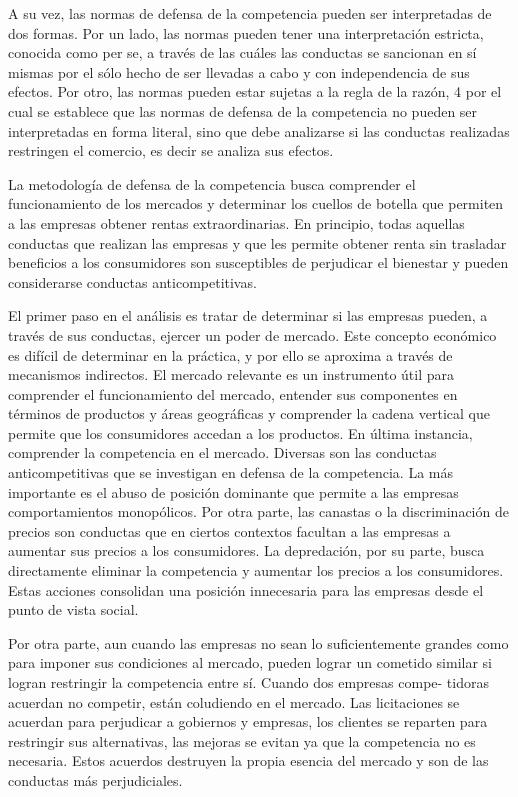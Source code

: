 \documentclass[
  12pt,
  spanish,
]{book}
\begin{document}
A su vez, las normas de defensa de la competencia pueden ser
interpretadas de dos formas. Por un lado, las normas pueden tener una
interpretación estricta, conocida como per se, a través de las cuáles
las conductas se sancionan en sí mismas por el sólo hecho de ser
llevadas a cabo y con independencia de sus efectos. Por otro, las normas
pueden estar sujetas a la regla de la razón, 4 por el cual se establece
que las normas de defensa de la competencia no pueden ser interpretadas
en forma literal, sino que debe analizarse si las conductas realizadas
restringen el comercio, es decir se analiza sus efectos.

La metodología de defensa de la competencia busca comprender el
funcionamiento de los mercados y determinar los cuellos de botella que
permiten a las empresas obtener rentas extraordinarias. En principio,
todas aquellas conductas que realizan las empresas y que les permite
obtener renta sin trasladar beneficios a los consumidores son
susceptibles de perjudicar el bienestar y pueden considerarse conductas
anticompetitivas.

El primer paso en el análisis es tratar de determinar si las empresas
pueden, a través de sus conductas, ejercer un poder de mercado. Este
concepto económico es difícil de determinar en la práctica, y por ello
se aproxima a través de mecanismos indirectos. El mercado relevante es
un instrumento útil para comprender el funcionamiento del mercado,
entender sus componentes en términos de productos y áreas geográficas y
comprender la cadena vertical que permite que los consumidores accedan a
los productos. En última instancia, comprender la competencia en el
mercado. Diversas son las conductas anticompetitivas que se investigan
en defensa de la competencia. La más importante es el abuso de posición
dominante que permite a las empresas comportamientos monopólicos. Por
otra parte, las canastas o la discriminación de precios son conductas
que en ciertos contextos facultan a las empresas a aumentar sus precios
a los consumidores. La depredación, por su parte, busca directamente
eliminar la competencia y aumentar los precios a los consumidores. Estas
acciones consolidan una posición innecesaria para las empresas desde el
punto de vista social.

Por otra parte, aun cuando las empresas no sean lo suficientemente
grandes como para imponer sus condiciones al mercado, pueden lograr un
cometido similar si logran restringir la competencia entre sí. Cuando
dos empresas compe- tidoras acuerdan no competir, están coludiendo en el
mercado. Las licitaciones se acuerdan para perjudicar a gobiernos y
empresas, los clientes se reparten para restringir sus alternativas, las
mejoras se evitan ya que la competencia no es necesaria. Estos acuerdos
destruyen la propia esencia del mercado y son de las conductas más
perjudiciales.
\end{document}
